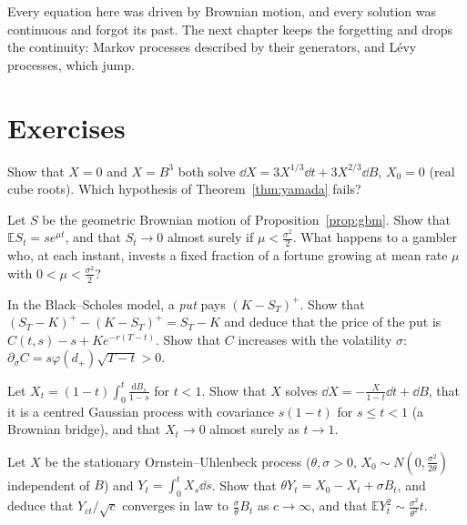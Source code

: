 Every equation here was driven by Brownian motion, and every solution was continuous and forgot its past. The next chapter keeps the forgetting and drops
the continuity: Markov processes described by their generators, and L\'evy processes, which jump.

\section{Exercises}

\begin{exercise}[$\star$]\label{ex:nonunique}
Show that $X=0$ and $X=B^3$ both solve $\dd X=3X^{1/3}\dd t+3X^{2/3}\dd B$, $X_0=0$ (real cube roots). Which hypothesis of Theorem~\ref{thm:yamada} fails?
\end{exercise}

\begin{exercise}[$\star$]\label{ex:gbm}
Let $S$ be the geometric Brownian motion of Proposition~\ref{prop:gbm}. Show that $\mathbb ES_t=se^{\mu t}$, and that $S_t\to0$ almost surely if $\mu<\frac{\sigma^2}2$. What happens to a gambler who, at each instant,
invests a fixed fraction of a fortune growing at mean rate $\mu$ with $0<\mu<\frac{\sigma^2}2$?
\end{exercise}

\begin{exercise}[$\star$]\label{ex:putcall}
In the Black--Scholes model, a \emph{put} pays $(K-S_T)^+$. Show that $(S_T-K)^+-(K-S_T)^+=S_T-K$ and deduce that the price of the put is $C(t,s)-s+Ke^{-r(T-t)}$. Show that $C$ increases with the
volatility $\sigma$: $\partial_\sigma C=s\varphi(d_+)\sqrt{T-t}>0$.
\end{exercise}

\begin{exercise}[$\star\star$]\label{ex:bridgesde}
Let $X_t=(1-t)\int_0^t\frac{\mathrm dB_s}{1-s}$ for $t<1$. Show that $X$ solves $\dd X=-\frac{X}{1-t}\dd t+\dd B$, that it is a centred Gaussian process with covariance $s(1-t)$ for $s\le t<1$ (a Brownian bridge),
and that $X_t\to0$ almost surely as $t\to1$.
\end{exercise}

\begin{exercise}[$\star\star$]\label{ex:langevin}
Let $X$ be the stationary Ornstein--Uhlenbeck process ($\theta,\sigma>0$, $X_0\sim N(0,\frac{\sigma^2}{2\theta})$ independent of $B$) and $Y_t=\int_0^tX_s\dd s$. Show that $\theta Y_t=X_0-X_t+\sigma B_t$, and deduce that
$Y_{ct}/\sqrt c$ converges in law to $\frac\sigma\theta B_t$ as $c\to\infty$, and that $\mathbb EY_t^2\sim\frac{\sigma^2}{\theta^2}t$.
\end{exercise}

